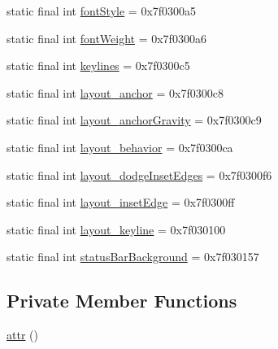 \begin{DoxyCompactItemize}
\item 
static final int \mbox{\hyperlink{classandroid_1_1support_1_1graphics_1_1drawable_1_1animated_1_1_r_1_1attr_a5f7863687d4567c9c41800c81fa08275}{font\+Style}} = 0x7f0300a5
\item 
static final int \mbox{\hyperlink{classandroid_1_1support_1_1graphics_1_1drawable_1_1animated_1_1_r_1_1attr_acf77cf00a4ce91f975f11783754189c1}{font\+Weight}} = 0x7f0300a6
\item 
static final int \mbox{\hyperlink{classandroid_1_1support_1_1graphics_1_1drawable_1_1animated_1_1_r_1_1attr_a380166bb5e3aa13bac935bf35795064f}{keylines}} = 0x7f0300c5
\item 
static final int \mbox{\hyperlink{classandroid_1_1support_1_1graphics_1_1drawable_1_1animated_1_1_r_1_1attr_abe446f2c1ea9be95f0cd412b5fd7e28f}{layout\+\_\+anchor}} = 0x7f0300c8
\item 
static final int \mbox{\hyperlink{classandroid_1_1support_1_1graphics_1_1drawable_1_1animated_1_1_r_1_1attr_a4585f87bbeec09bd74c1ef67e6e2f3e6}{layout\+\_\+anchor\+Gravity}} = 0x7f0300c9
\item 
static final int \mbox{\hyperlink{classandroid_1_1support_1_1graphics_1_1drawable_1_1animated_1_1_r_1_1attr_a2254df80ca3b4fa4c5983100e014d7c7}{layout\+\_\+behavior}} = 0x7f0300ca
\item 
static final int \mbox{\hyperlink{classandroid_1_1support_1_1graphics_1_1drawable_1_1animated_1_1_r_1_1attr_a12ed4d17beb3ead832532478acf04e3c}{layout\+\_\+dodge\+Inset\+Edges}} = 0x7f0300f6
\item 
static final int \mbox{\hyperlink{classandroid_1_1support_1_1graphics_1_1drawable_1_1animated_1_1_r_1_1attr_a710834690556e47ac95df2629b7ed09e}{layout\+\_\+inset\+Edge}} = 0x7f0300ff
\item 
static final int \mbox{\hyperlink{classandroid_1_1support_1_1graphics_1_1drawable_1_1animated_1_1_r_1_1attr_a86106315d66ef83079ed2aafed800544}{layout\+\_\+keyline}} = 0x7f030100
\item 
static final int \mbox{\hyperlink{classandroid_1_1support_1_1graphics_1_1drawable_1_1animated_1_1_r_1_1attr_a9774a4d958acfb6faa64e44fb5306868}{status\+Bar\+Background}} = 0x7f030157
\end{DoxyCompactItemize}
\subsection*{Private Member Functions}
\begin{DoxyCompactItemize}
\item 
\mbox{\hyperlink{classandroid_1_1support_1_1graphics_1_1drawable_1_1animated_1_1_r_1_1attr_a074b3b48ba62b6bfc501f8de1d4db736}{attr}} ()
\end{DoxyCompactItemize}


